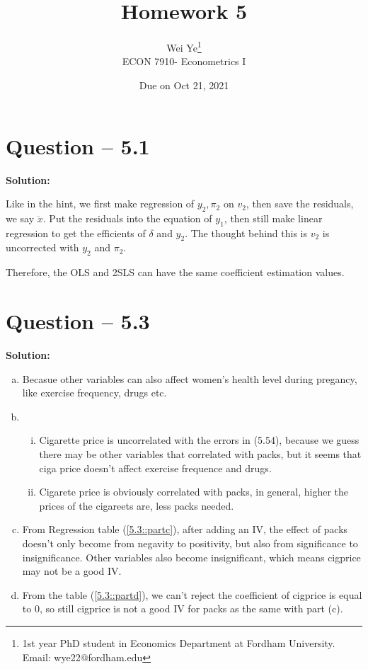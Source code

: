 \documentclass[11pt]{article} %
\title{Homework 5}
\author{Wei Ye\footnote{ 1st year PhD student in Economics Department at Fordham University. Email: wye22@fordham.edu}
    \\ ECON 7910- Econometrics I}
\date{Due on Oct 21, 2021}
\begin{document}
\maketitle



\section{Question -- 5.1}
\textbf{Solution:}

Like in the hint, we first make regression of $y_2,\pi_2$ on $v_2$, then save the residuals, we say $\ddot{x}$. Put the residuals into the equation of $y_1$, then still make linear regression to get the efficients of $\delta$ and $y_2$. 
The thought behind this is $v_2$ is uncorrected with $y_2$ and $\pi_2$. 

Therefore, the OLS and 2SLS can have the same coefficient estimation values.



\section{Question -- 5.3}
\textbf{Solution:}
\begin{enumerate}[a)]
	\item Becasue other variables can also affect women's health level during pregancy, like exercise frequency, drugs etc. 
	\item \begin{enumerate}[i)]
		\item Cigarette price is uncorrelated with the errors in (5.54), because we guess there may be other variables that correlated with packs, but it seems that ciga price doesn't affect exercise 
		   frequence and drugs.
		\item Cigarete price is obviously correlated with packs, in general, higher the prices of the cigareets are, less packs needed. 
	\end{enumerate}
	\item From Regression table (\ref{5.3::partc}), after adding an IV, the effect of packs doesn't only become from negavity to positivity, but also from significance to insignificance. Other variables also become insignificant, which means cigprice may not be a good IV.
	\item From the table (\ref{5.3::partd}), we can't reject the coefficient of cigprice is equal to 0, so still cigprice is not a good IV for packs as the same with part (c).
\end{enumerate}
\end{document}
